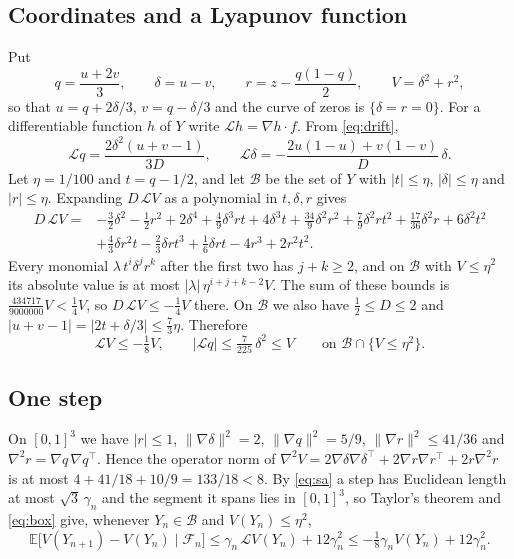 \documentclass[11pt]{amsart}
\theoremstyle{remark}
\newcommand{\E}{\mathbb{E}}
\newcommand{\cF}{\mathcal{F}}
\begin{document}
\subsection{Coordinates and a Lyapunov function}
Put
\[
q=\frac{u+2v}3,\qquad \delta=u-v,\qquad r=z-\frac{q(1-q)}2,\qquad V=\delta^2+r^2,
\]
so that $u=q+2\delta/3$, $v=q-\delta/3$ and the curve of zeros is $\{\delta=r=0\}$. For a differentiable function $h$ of $Y$ write $\mathcal L h=\nabla h\cdot f$. From \eqref{eq:drift},
\begin{equation}\label{eq:Lq}
\mathcal Lq=\frac{2\delta^2(u+v-1)}{3D},\qquad \mathcal L\delta=-\frac{2u(1-u)+v(1-v)}{D}\,\delta .
\end{equation}
Let $\eta=1/100$ and $t=q-1/2$, and let $\mathcal B$ be the set of $Y$ with $|t|\le\eta$, $|\delta|\le\eta$ and $|r|\le\eta$. Expanding $D\,\mathcal LV$ as a polynomial in $t,\delta,r$ gives
\begin{equation}\label{eq:DLV}
\begin{aligned}
D\,\mathcal LV={}&-\tfrac32\delta^2-\tfrac12r^2+2\delta^4+\tfrac49\delta^3rt+4\delta^3t+\tfrac{34}9\delta^2r^2+\tfrac79\delta^2rt^2+\tfrac{17}{36}\delta^2r+6\delta^2t^2\\
&+\tfrac43\delta r^2t-\tfrac23\delta rt^3+\tfrac16\delta rt-4r^3+2r^2t^2 .
\end{aligned}
\end{equation}
Every monomial $\lambda\,t^i\delta^jr^k$ after the first two has $j+k\ge2$, and on $\mathcal B$ with $V\le\eta^2$ its absolute value is at most $|\lambda|\,\eta^{i+j+k-2}V$. The sum of these bounds is $\frac{434717}{9000000}V<\frac14V$, so $D\,\mathcal LV\le-\frac14V$ there. On $\mathcal B$ we also have $\frac12\le D\le2$ and $|u+v-1|=|2t+\delta/3|\le\frac73\eta$. Therefore
\begin{equation}\label{eq:box}
\mathcal LV\le-\tfrac18V,\qquad |\mathcal Lq|\le\tfrac{7}{225}\,\delta^2\le V\qquad\text{on }\mathcal B\cap\{V\le\eta^2\}.
\end{equation}

\subsection{One step}
On $[0,1]^3$ we have $|r|\le1$, $\|\nabla\delta\|^2=2$, $\|\nabla q\|^2=5/9$, $\|\nabla r\|^2\le41/36$ and $\nabla^2 r=\nabla q\,\nabla q^{\top}$. Hence the operator norm of $\nabla^2V=2\nabla\delta\nabla\delta^\top+2\nabla r\nabla r^\top+2r\nabla^2r$ is at most $4+41/18+10/9=133/18<8$. By \eqref{eq:sa} a step has Euclidean length at most $\sqrt3\,\gamma_n$ and the segment it spans lies in $[0,1]^3$, so Taylor's theorem and \eqref{eq:box} give, whenever $Y_n\in\mathcal B$ and $V(Y_n)\le\eta^2$,
\begin{equation}\label{eq:step}
\E\bigl[V(Y_{n+1})-V(Y_n)\mid\cF_n\bigr]\le\gamma_n\,\mathcal LV(Y_n)+12\gamma_n^2\le-\tfrac18\gamma_nV(Y_n)+12\gamma_n^2 .
\end{equation}
\end{document}
